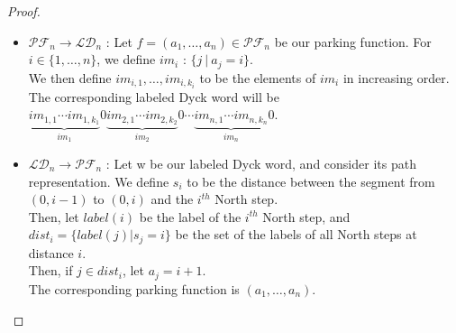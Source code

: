 \documentclass[12pt]{report}
\begin{document}
\begin{proof}
    ~\
    \begin{itemize}
        \item $\mathcal{PF}_n \to \mathcal{LD}_n$ :
        Let $f = (a_1, \ldots, a_n) \in \mathcal{PF}_n$
        be our parking function. For $i \in \{1, \ldots,
        n\}$, we define $im_i$ : $\{j\ |\ a_j = i\}$. \\
        We then define $im_{i,1}, \ldots, im_{i,k_i}$ to be
        the elements of $im_i$ in increasing order.\\
        The corresponding labeled Dyck word will be \\
        $\underbrace{im_{1,1} \cdots im_{1,k_1}}_{im_1}0
         \underbrace{im_{2,1} \cdots im_{2,k_2}}_{im_2}0
         \cdots
         \underbrace{im_{n,1} \cdots im_{n,k_n}}_{im_n}0$.

        \item $\mathcal{LD}_n \to \mathcal{PF}_n$ :
        Let w be our labeled Dyck word, and consider its
        path representation. We define $s_i$ to be the
        distance between the segment from $(0, i-1)$ to
        $(0,i)$ and the $i^{th}$ North step.\\
        Then, let $label(i)$ be the label of the $i^{th}$
        North step, and $dist_i = \{label(j) | s_j = i\}$
        be the set of the labels of all North steps at
        distance $i$.\\
        Then, if $j \in dist_i$, let $a_j = i + 1$.\\
        The corresponding parking function is
        $(a_1, \ldots, a_n)$.
    \end{itemize}
\end{proof}
\end{document}
